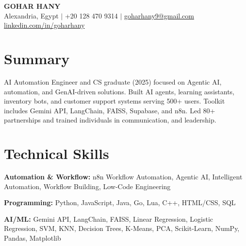 \documentclass[11pt,a4paper]{article}
\begin{document}
\begin{center}
    {\LARGE\bfseries GOHAR HANY}\\[4pt]
    Alexandria, Egypt $|$ +20 128 470 9314 $|$ \href{mailto:goharhany9@gmail.com}{goharhany9@gmail.com}\\[2pt]
    \href{https://linkedin.com/in/goharhany}{linkedin.com/in/goharhany}
\end{center}

\vspace{8pt}

\section*{Summary}

AI Automation Engineer and CS graduate (2025) focused on Agentic AI, automation, and GenAI-driven solutions. Built AI agents, learning assistants, inventory bots, and customer support systems serving 500+ users. Toolkit includes Gemini API, LangChain, FAISS, Supabase, and n8n. Led 80+ partnerships and trained individuals in communication, and leadership.

\section*{Technical Skills}

\textbf{Automation \& Workflow:} n8n Workflow Automation, Agentic AI, Intelligent Automation, Workflow Building, Low-Code Engineering

\vspace{6pt}

\textbf{Programming:} Python, JavaScript, Java, Go, Lua, C++, HTML/CSS, SQL

\vspace{6pt}

\textbf{AI/ML:} Gemini API, LangChain, FAISS, Linear Regression, Logistic Regression, SVM, KNN, Decision Trees, K-Means, PCA, Scikit-Learn, NumPy, Pandas, Matplotlib
\end{document}
